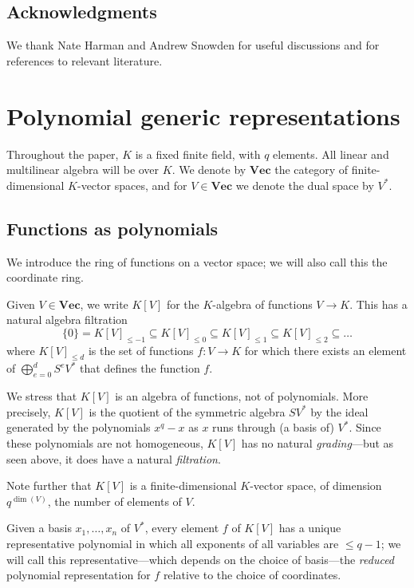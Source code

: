 \documentclass{amsart}
\renewcommand{\Vec}{\mathbf{Vec}}
\begin{document}
\subsection*{Acknowledgments}

We thank Nate Harman and Andrew Snowden for useful discussions and for
references to relevant literature. 

\section{Polynomial generic representations} \label{sec:PolyReps}

Throughout the paper, $K$ is a fixed finite field, with $q$ elements. All
linear and multilinear algebra will be over $K$. We denote by $\Vec$ the
category of finite-dimensional $K$-vector spaces, and for $V \in \Vec$
we denote the dual space by $V^*$.

\subsection{Functions as polynomials} 

We introduce the ring of functions on a vector space; we
will also call this the coordinate ring. 

\begin{de}
Given $V \in \Vec$, we write $K[V]$ for the $K$-algebra of functions $V
\to K$. This has a natural algebra filtration
\[ \{0\}=K[V]_{\leq -1} \subseteq K[V]_{\leq 0} \subseteq K[V]_{\leq
1} \subseteq K[V]_{\leq 2} \subseteq \dots \]
where $K[V]_{\leq d}$ is the set of functions $f:V \to K$ for which
there exists an element of $\bigoplus_{e=0}^d S^e V^*$
that defines the function $f$.
\end{de}

We stress that $K[V]$ is an algebra of functions, not of polynomials. More
precisely, $K[V]$ is the quotient of the symmetric algebra $S V^*$
by the ideal generated by the polynomials $x^q-x$ as $x$ runs through
(a basis of) $V^*$. Since these polynomials are not homogeneous, $K[V]$
has no natural {\em grading}---but as seen above, it does have a natural
{\em filtration}.

Note further that $K[V]$ is a finite-dimensional $K$-vector
space, of dimension $q^{\dim(V)}$, the number of elements of $V$. 

\begin{de}
Given a basis $x_1,\dots,x_n$ of $V^*$, every element $f$ of $K[V]$ has a
unique representative polynomial in which all exponents of all variables
are $\leq q-1$; we will call this representative---which depends on the
choice of basis---the {\em reduced} polynomial representation for $f$
relative to the choice of coordinates.
\end{de}
\end{document}
